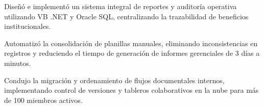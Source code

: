 
\begin{cvitems}
    \item Diseñó e implementó un sistema integral de reportes y auditoría operativa utilizando VB .NET y Oracle SQL, centralizando la trazabilidad de beneficios institucionales.
    \item Automatizó la consolidación de planillas manuales, eliminando inconsistencias en registros y reduciendo el tiempo de generación de informes gerenciales de 3 días a minutos.
\end{cvitems}

\begin{cvitems}
    \item Condujo la migración y ordenamiento de flujos documentales internos, implementando control de versiones y tableros colaborativos en la nube para más de 100 miembros activos.
\end{cvitems}
